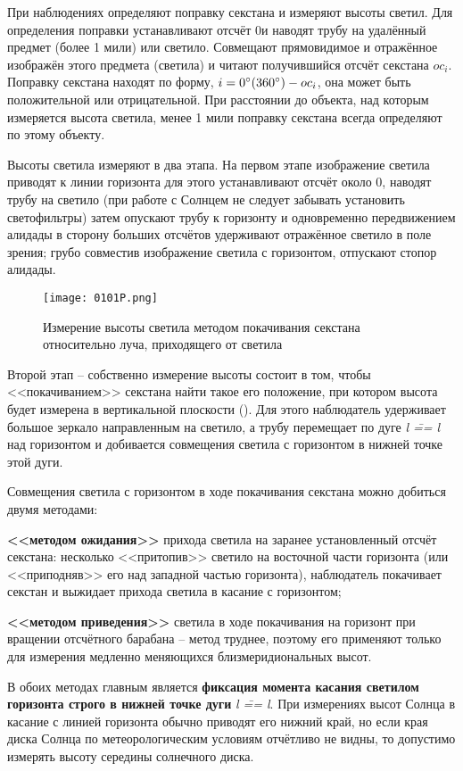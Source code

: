 При наблюдениях определяют поправку секстана и измеряют высоты
светил. Для определения поправки устанавливают отсчёт 0\gr и наводят
трубу на удалённый предмет (более 1 мили) или светило. Совмещают
прямовидимое и отражённое изображён этого предмета (светила) и читают
получившийся отсчёт секстана $oc_i$. Поправку секстана находят по форму,
$i = 0^\circ (360^\circ) - oc_i$, она может быть положительной или
отрицательной. При расстоянии до объекта, над которым измеряется
высота светила, менее 1 мили поправку секстана всегда определяют по
этому объекту.

Высоты светила измеряют в два этапа. На первом этапе изображение
светила приводят к линии горизонта для этого устанавливают отсчёт
около 0\gr, наводят трубу на светило (при работе с Солнцем не следует
забывать установить светофильтры) затем опускают трубу к горизонту и
одновременно передвижением алидады в сторону больших отсчётов
удерживают отражённое светило в поле зрения; грубо совместив
изображение светила с горизонтом, отпускают стопор алидады.

\begin{figure*}[!htb]
  \centering
  \texttt{[image: 0101P.png]}
  \caption{Измерение высоты светила методом покачивания секстана
    относительно луча, приходящего от светила}
  \label{fig:101}
\end{figure*}

Второй этап \--- собственно измерение высоты состоит в том, чтобы
<<покачиванием>> секстана найти такое его положение, при котором высота
будет измерена в вертикальной плоскости (). Для этого
наблюдатель удерживает большое зеркало направленным на светило, а
трубу перемещает по дуге \textit{l \=== l} над горизонтом и добивается совмещения
светила с горизонтом в нижней точке этой дуги.

Совмещения светила с горизонтом в ходе покачивания секстана можно добиться двумя методами:

\textbf{<<методом ожидания>>} прихода светила на заранее установленный
отсчёт секстана: несколько <<притопив>> светило на восточной части
горизонта (или <<приподняв>> его над западной частью горизонта),
наблюдатель покачивает секстан и выжидает прихода светила в касание с
горизонтом;

\textbf{<<методом приведения>>} светила в ходе покачивания на горизонт
при вращении отсчётного барабана \--- метод труднее, поэтому его
применяют только для измерения медленно меняющихся близмеридиональных
высот.

В обоих методах главным является \textbf{фиксация момента касания светилом
горизонта строго в нижней точке дуги} \textit{l \=== l}. При измерениях
высот Солнца в касание с линией горизонта обычно приводят его нижний
край, но если края диска Солнца по метеорологическим условиям
отчётливо не видны, то допустимо измерять высоту середины солнечного
диска.


